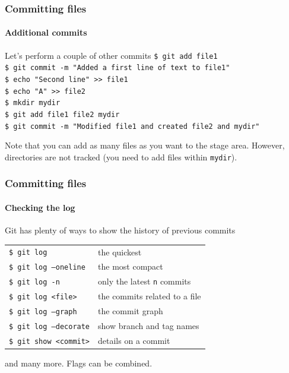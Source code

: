 \begin{frame}
\frametitle{Committing files}
\framesubtitle{Additional commits}

\begin{block}{Let's perform a couple of other commits}
\texttt{\$ git add file1} \\
\texttt{\$ git commit -m "Added a first line of text to file1"} \\
\texttt{\$ echo "Second line" >\;\!\!> file1} \\
\texttt{\$ echo "A" >\;\!\!> file2} \\ 
\texttt{\$ mkdir mydir} \\ 
\texttt{\$ git add file1 file2 mydir} \\
\texttt{\$ git commit -m "Modified file1 and created file2 and mydir"} 

\medskip
Note that you can add as many files as you want to the stage area. However, directories are not tracked (you need to add files within \texttt{mydir}).
\end{block}

\end{frame}

\begin{frame}
\frametitle{Committing files}
\framesubtitle{Checking the log}

\begin{block}{Git has plenty of ways to show the history of previous commits}
\begin{tabular}{ll}
\texttt{\$ git log} & the quickest \\
\texttt{\$ git log ---oneline} & the most compact \\
\texttt{\$ git log -n} & only the latest \texttt{n} commits \\
\texttt{\$ git log <file>} & the commits related to a file \\
\texttt{\$ git log ---graph} & the commit graph \\
\texttt{\$ git log ---decorate} & show branch and tag names \\
\texttt{\$ git show <commit>} & details on a commit
\end{tabular}

\medskip
and many more. Flags can be combined.
\end{block}
\end{frame}

